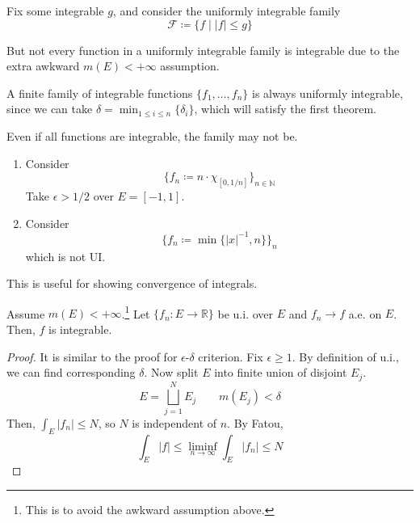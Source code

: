   \begin{example}
    Fix some integrable $g$, and consider the uniformly integrable family 
    \begin{equation}
      \mathscr{F} \coloneqq \{ f \mid |f| \leq g \}
    \end{equation}
  \end{example}

  But not every function in a uniformly integrable family is integrable due to the extra awkward $m(E) < +\infty$ assumption.  

  \begin{example}
    A finite family of integrable functions $\{f_1, \ldots, f_n\}$ is always uniformly integrable, since we can take $\delta = \min_{1 \leq i \leq n} \{\delta_i\}$, which will satisfy the first theorem. 
  \end{example}

  \begin{example}
    Even if all functions are integrable, the family may not be. 
    \begin{enumerate}
      \item Consider 
      \begin{equation}
        \{f_n \coloneqq n \cdot \chi_{[0, 1/n]}\}_{n \in \mathbb{N}} 
      \end{equation}
      Take $\epsilon > 1/2$ over $E = [-1, 1]$. 

      \item Consider 
      \begin{equation}
        \{f_n \coloneqq \min\{|x|^{-1}, n\} \}_n
      \end{equation}
      which is not UI. 
    \end{enumerate}
  \end{example}

  This is useful for showing convergence of integrals. 

  \begin{lemma} 
    Assume $m(E) < +\infty$.\footnote{This is to avoid the awkward assumption above.} Let $\{f_n: E \to \mathbb{R}\}$ be u.i. over $E$ and $f_n \to f$ a.e. on $E$. Then, $f$ is integrable. 
  \end{lemma}
  \begin{proof}
    It is similar to the proof for $\epsilon$-$\delta$ criterion. Fix $\epsilon \geq 1$. By definition of u.i., we can find corresponding $\delta$. Now split $E$ into finite union of disjoint $E_j$. 
    \begin{equation}
      E = \bigsqcup_{j=1}^N E_j \qquad m(E_j) < \delta
    \end{equation}
    Then, $\int_E |f_n| \leq N$, so $N$ is independent of $n$. By Fatou, 
    \begin{equation}
      \int_E |f| \leq \liminf_{n \to \infty} \int_E |f_n| \leq N
    \end{equation}
  \end{proof}

